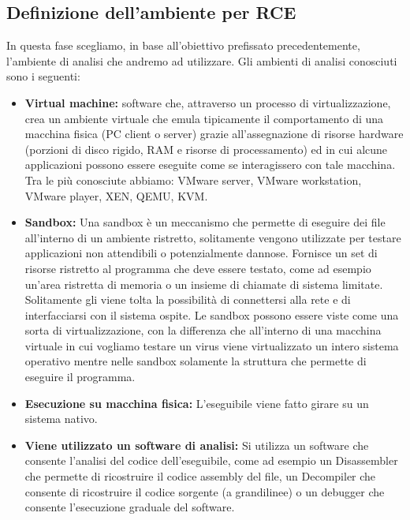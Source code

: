\documentclass[8pt]{extarticle}
\begin{document}
\subsection{Definizione dell’ambiente per RCE}
In questa fase scegliamo, in base all’obiettivo prefissato precedentemente, l’ambiente di analisi 
che andremo ad utilizzare. Gli ambienti di analisi conosciuti sono i seguenti:
\begin{itemize}
    \item \textbf{Virtual machine:} software che, attraverso un processo di virtualizzazione, 
    crea un ambiente virtuale che emula tipicamente il comportamento di una macchina fisica 
    (PC client o server) grazie all'assegnazione di risorse hardware (porzioni di disco rigido, 
    RAM e risorse di processamento) ed in cui alcune applicazioni possono essere eseguite come 
    se interagissero con tale macchina. Tra le più conosciute abbiamo: VMware server, 
    VMware workstation, VMware player, XEN, QEMU, KVM.
    \item \textbf{Sandbox:} Una sandbox è un meccanismo che permette di eseguire dei file all’interno 
    di un ambiente ristretto, solitamente vengono utilizzate per testare applicazioni non attendibili 
    o potenzialmente dannose.
    Fornisce un set di risorse ristretto al programma che deve essere testato, come ad esempio un’area 
    ristretta di memoria o un insieme di chiamate di sistema limitate.
    Solitamente gli viene tolta la possibilità di connettersi alla rete e di interfacciarsi con il 
    sistema ospite.
    Le sandbox possono essere viste come una sorta di virtualizzazione, con la differenza che 
    all’interno di una macchina virtuale in cui vogliamo testare un virus viene virtualizzato un 
    intero sistema operativo mentre nelle sandbox solamente la struttura che permette di eseguire il programma.
    \item \textbf{Esecuzione su macchina fisica:} L’eseguibile viene fatto girare su un sistema nativo.
    \item \textbf{Viene utilizzato un software di analisi:} Si utilizza un software che consente l’analisi del 
    codice dell’eseguibile, come ad esempio un Disassembler che permette di ricostruire il codice assembly del 
    file, un Decompiler  che consente di ricostruire il codice sorgente (a grandilinee) o un debugger che 
    consente l’esecuzione graduale del software.
\end{itemize}
\end{document}
